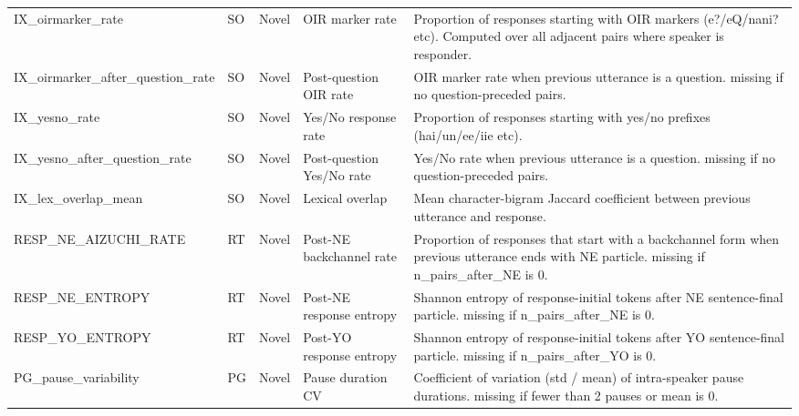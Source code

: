 {\begin{longtable}{lllp{1.9cm}p{3.6cm}}
IX\_oirmarker\_rate & SO & Novel & OIR marker rate & Proportion of responses starting with OIR markers (e?/eQ/nani? etc). Computed over all adjacent pairs where speaker is responder. \\
IX\_oirmarker\_after\_question\_rate & SO & Novel & Post-question OIR rate & OIR marker rate when previous utterance is a question. missing if no question-preceded pairs. \\
IX\_yesno\_rate & SO & Novel & Yes/No response rate & Proportion of responses starting with yes/no prefixes (hai/un/ee/iie etc). \\
IX\_yesno\_after\_question\_rate & SO & Novel & Post-question Yes/No rate & Yes/No rate when previous utterance is a question. missing if no question-preceded pairs. \\
IX\_lex\_overlap\_mean & SO & Novel & Lexical overlap & Mean character-bigram Jaccard coefficient between previous utterance and response. \\
RESP\_NE\_AIZUCHI\_RATE & RT & Novel & Post-NE backchannel rate & Proportion of responses that start with a backchannel form when previous utterance ends with NE particle. missing if n\_pairs\_after\_NE is 0. \\
RESP\_NE\_ENTROPY & RT & Novel & Post-NE response entropy & Shannon entropy of response-initial tokens after NE sentence-final particle. missing if n\_pairs\_after\_NE is 0. \\
RESP\_YO\_ENTROPY & RT & Novel & Post-YO response entropy & Shannon entropy of response-initial tokens after YO sentence-final particle. missing if n\_pairs\_after\_YO is 0. \\
PG\_pause\_variability & PG & Novel & Pause duration CV & Coefficient of variation (std / mean) of intra-speaker pause durations. missing if fewer than 2 pauses or mean is 0. \\
\end{longtable}
}
